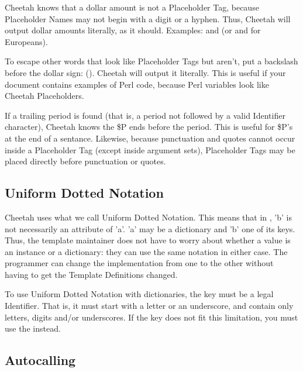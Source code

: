 Cheetah knows that a dollar amount is not a Placeholder Tag, because
Placeholder Names may not begin with a digit or a hyphen.  Thus, Cheetah will
output dollar amounts literally, as it should.  Examples:
 and  (or  and 
for Europeans).

To escape other words that look like Placeholder Tags but aren't, put a 
backslash before the dollar sign: ().  Cheetah
will output it literally.  This is useful if your document contains examples of
Perl code, because Perl variables look like Cheetah Placeholders.

If a trailing period is found (that is, a period not followed by a valid
Identifier character), Cheetah knows the \$P ends before the
period.  This is useful for \$P's at the end of a sentance.  Likewise, because
punctuation and quotes cannot occur inside a Placeholder Tag (except inside
argument sets), Placeholder Tags may be placed directly before punctuation or
quotes.

     

\subsection{Uniform Dotted Notation}

Cheetah uses what we call Uniform Dotted Notation.  This means that in
, 'b' is not necessarily an attribute of 'a'.  'a' may be a
dictionary and 'b' one of its keys.  Thus, the template maintainer does not have
to worry about whether a value is an instance or a dictionary: they can use the
same notation in either case.  The programmer can change the implementation
from one to the other without having to get the Template Definitions changed.

To use Uniform Dotted Notation with dictionaries, the key must be a legal
Identifier.  That is, it must start with a letter or an underscore, and contain
only letters, digits and/or underscores.  If the key does not fit this
limitation, you must use the  instead.


\subsection{Autocalling}

